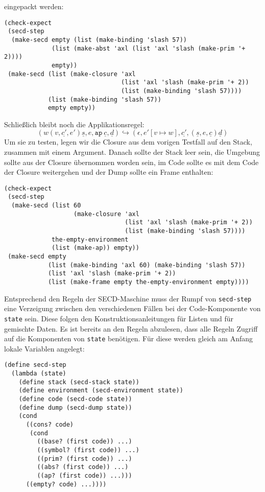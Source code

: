 eingepackt werden:
%
\begin{lstlisting}
(check-expect
 (secd-step
  (make-secd empty (list (make-binding 'slash 57))
             (list (make-abst 'axl (list 'axl 'slash (make-prim '+ 2))))
             empty))
 (make-secd (list (make-closure 'axl
                                (list 'axl 'slash (make-prim '+ 2))
                                (list (make-binding 'slash 57))))
            (list (make-binding 'slash 57))
            empty empty))
\end{lstlisting}
%
Schließlich bleibt noch die Applikationsregel:
%
\begin{displaymath}
  (w (v,\underline{c'}, e') \underline{s}, e, \mathtt{ap}~\underline{c}, \underline{d})
  \hookrightarrow
  (\epsilon, e'[v\mapsto w], \underline{c'}, (\underline{s}, e, \underline{c}) \underline{d})
\end{displaymath}
%
Um sie zu testen, legen wir die Closure aus dem vorigen Testfall auf
den Stack, zusammen mit einem Argument.  Danach sollte der Stack leer
sein, die Umgebung sollte aus der Closure übernommen worden sein, im
Code sollte es mit dem Code der Closure weitergehen und der Dump
sollte ein Frame enthalten:
%
\begin{lstlisting}
(check-expect
 (secd-step
  (make-secd (list 60
                   (make-closure 'axl
                                 (list 'axl 'slash (make-prim '+ 2))
                                 (list (make-binding 'slash 57))))
             the-empty-environment
             (list (make-ap)) empty))
 (make-secd empty
            (list (make-binding 'axl 60) (make-binding 'slash 57))
            (list 'axl 'slash (make-prim '+ 2))
            (list (make-frame empty the-empty-environment empty))))
\end{lstlisting}
%
Entsprechend den Regeln der SECD-Maschine muss der Rumpf von
\lstinline{secd-step}
eine Verzeigung zwischen den verschiedenen Fällen bei der
Code-Komponente von \lstinline{state} sein.  Diese folgen den
Konstruktionsanleitungen für Listen und für gemischte Daten.  Es ist
bereits an den Regeln abzulesen, dass alle Regeln Zugriff auf die
Komponenten von \lstinline{state} benötigen.  Für diese werden gleich am
Anfang lokale Variablen angelegt:
%
\begin{lstlisting}
(define secd-step
  (lambda (state)
    (define stack (secd-stack state))
    (define environment (secd-environment state))
    (define code (secd-code state))
    (define dump (secd-dump state))
    (cond
      ((cons? code)
       (cond
         ((base? (first code)) ...)
         ((symbol? (first code)) ...)
         ((prim? (first code)) ...)
         ((abs? (first code)) ...)
         ((ap? (first code)) ...)))
      ((empty? code) ...))))
\end{lstlisting}
